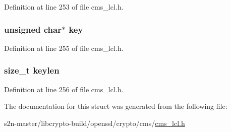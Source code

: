 Definition at line 253 of file cms\+\_\+lcl.\+h.

\subsubsection[{\texorpdfstring{key}{key}}]{\setlength{\rightskip}{0pt plus 5cm}unsigned char$\ast$ key}\hypertarget{struct_c_m_s___k_e_k_recipient_info__st_a1cb5ee363f3d6d0f548eb6e64d72a7c8}{}\label{struct_c_m_s___k_e_k_recipient_info__st_a1cb5ee363f3d6d0f548eb6e64d72a7c8}


Definition at line 255 of file cms\+\_\+lcl.\+h.

\subsubsection[{\texorpdfstring{keylen}{keylen}}]{\setlength{\rightskip}{0pt plus 5cm}size\+\_\+t keylen}\hypertarget{struct_c_m_s___k_e_k_recipient_info__st_af347fae5dae0b613448c54f3dea76ad2}{}\label{struct_c_m_s___k_e_k_recipient_info__st_af347fae5dae0b613448c54f3dea76ad2}


Definition at line 256 of file cms\+\_\+lcl.\+h.



The documentation for this struct was generated from the following file\+:\begin{DoxyCompactItemize}
\item 
s2n-\/master/libcrypto-\/build/openssl/crypto/cms/\hyperlink{cms__lcl_8h}{cms\+\_\+lcl.\+h}\end{DoxyCompactItemize}
